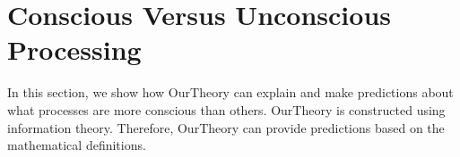 \documentclass[utf8]{article}
\newcommand{\needfig}[1]{%
			\ifthenelse{\equal{#1}{}}{%
				\todo[color=White, linecolor=Orange, bordercolor=RedOrange]{\textcolor{RedOrange}{Fig}}}{%
				\todo[color=White, linecolor=Orange, bordercolor=RedOrange]{\textcolor{RedOrange}{Fig: #1}}%
			}%
		}
\begin{document}
    
    
	\section{Conscious Versus Unconscious Processing}\label{sec:Conscious versus Unconscious Processing}
	    In this section, we show how \ac{OurTheory} can explain and make predictions about what processes are more conscious than others. \ac{OurTheory} is constructed using information theory. Therefore, \ac{OurTheory} can provide predictions based on the mathematical definitions. 
		
\end{document}
